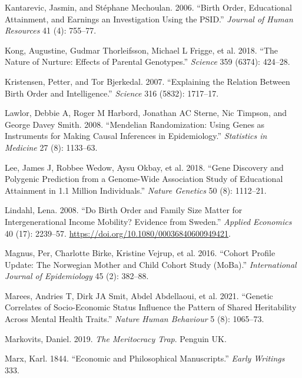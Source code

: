 \documentclass[
  12pt,
]{article}
\newlength{\cslhangindent}
\newenvironment{CSLReferences}[2] %
 {\begin{list}{}{%
  \setlength{\itemindent}{0pt}
  \setlength{\leftmargin}{0pt}
  \setlength{\parsep}{0pt}
  \ifodd #1
   \setlength{\leftmargin}{\cslhangindent}
   \setlength{\itemindent}{-1\cslhangindent}
  \fi
  \setlength{\itemsep}{#2\baselineskip}}}
 {\end{list}}
\theoremstyle{definition}
\theoremstyle{definition}
\theoremstyle{definition}
\theoremstyle{definition}
\theoremstyle{remark}
\begin{document}
\begin{CSLReferences}{1}{1}
Kantarevic, Jasmin, and Stéphane Mechoulan. 2006. {``Birth Order, Educational Attainment, and Earnings an Investigation Using the PSID.''} \emph{Journal of Human Resources} 41 (4): 755--77.

{Kong, Augustine, Gudmar Thorleifsson, Michael L Frigge, et al.} 2018. {``The Nature of Nurture: Effects of Parental Genotypes.''} \emph{Science} 359 (6374): 424--28.

Kristensen, Petter, and Tor Bjerkedal. 2007. {``Explaining the Relation Between Birth Order and Intelligence.''} \emph{Science} 316 (5832): 1717--17.

Lawlor, Debbie A, Roger M Harbord, Jonathan AC Sterne, Nic Timpson, and George Davey Smith. 2008. {``Mendelian Randomization: Using Genes as Instruments for Making Causal Inferences in Epidemiology.''} \emph{Statistics in Medicine} 27 (8): 1133--63.

{Lee, James J, Robbee Wedow, Aysu Okbay, et al.} 2018. {``Gene Discovery and Polygenic Prediction from a Genome-Wide Association Study of Educational Attainment in 1.1 Million Individuals.''} \emph{Nature Genetics} 50 (8): 1112--21.

Lindahl, Lena. 2008. {``Do Birth Order and Family Size Matter for Intergenerational Income Mobility? Evidence from Sweden.''} \emph{Applied Economics} 40 (17): 2239--57. \url{https://doi.org/10.1080/00036840600949421}.

{Magnus, Per, Charlotte Birke, Kristine Vejrup, et al.} 2016. {``Cohort Profile Update: The Norwegian Mother and Child Cohort Study (MoBa).''} \emph{International Journal of Epidemiology} 45 (2): 382--88.

Marees, Andries T, Dirk JA Smit, Abdel Abdellaoui, et al. 2021. {``Genetic Correlates of Socio-Economic Status Influence the Pattern of Shared Heritability Across Mental Health Traits.''} \emph{Nature Human Behaviour} 5 (8): 1065--73.

Markovits, Daniel. 2019. \emph{The Meritocracy Trap}. Penguin UK.

Marx, Karl. 1844. {``Economic and Philosophical Manuscripts.''} \emph{Early Writings} 333.


\end{CSLReferences}
\end{document}
